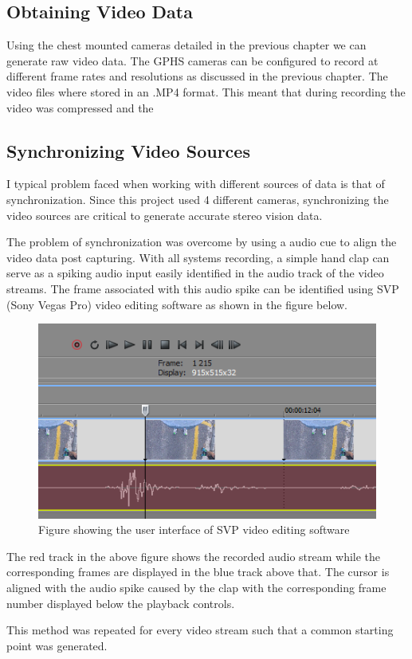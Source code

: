 \subsection{Obtaining Video Data}
Using the chest mounted cameras detailed in the previous chapter we can generate raw video data. The GPHS cameras can be configured to record at different frame rates and resolutions as discussed in the previous chapter. The video files where stored in an .MP4 format. This meant that during recording the video was compressed and the 


\subsection{Synchronizing Video Sources}
I typical problem faced when working with different sources of data is that of synchronization. Since this project used 4 different cameras, synchronizing the video sources are critical to generate accurate stereo vision data.

The problem of synchronization was overcome by using a audio cue to align the video data post capturing. With all systems recording, a simple hand clap can serve as a spiking audio input easily identified in the audio track of the video streams. The frame associated with this audio spike can be identified using SVP (Sony Vegas Pro) video editing software as shown in the figure below. 

\begin{figure}[!ht]
\centering
  \includegraphics[width=0.5\linewidth]{figures/svpframe.png}
  \caption{Figure showing the user interface of SVP video editing software}
  \label{fig:svpframe}
\end{figure}

The red track in the above figure shows the recorded audio stream while the corresponding frames are displayed in the blue track above that. The cursor is aligned with the audio spike caused by the clap with the corresponding frame number displayed below the playback controls.

This method was repeated for every video stream such that a common starting point was generated. 

